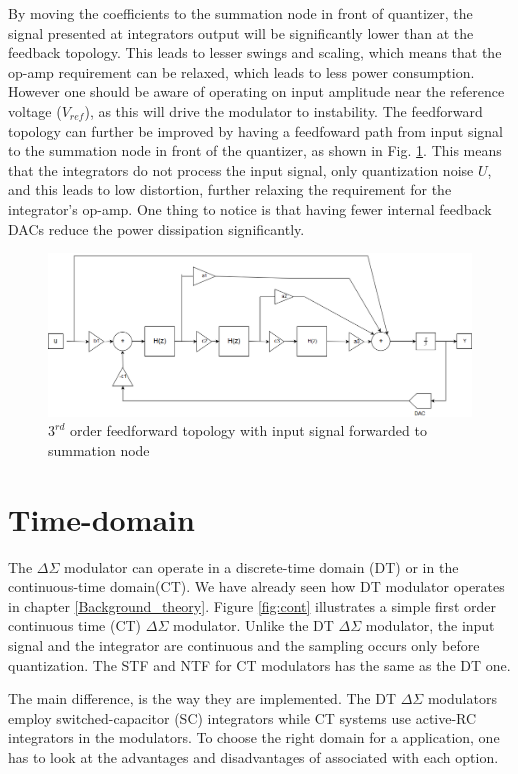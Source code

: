 By moving the coefficients to the summation node in front of quantizer, the signal presented at integrators output will be significantly lower than at the feedback topology. This leads to lesser swings and scaling, which means that the op-amp requirement can be relaxed, which leads to less power consumption. However one should be aware of operating on input amplitude near the reference voltage ($V_{ref}$), as this will drive the modulator to instability. The feedforward topology can further be improved by having a feedfoward path from input signal to the summation node in front of the quantizer, as shown in Fig. \ref{fig:input}. This means that the integrators do not process the input signal, only quantization noise $U$, and this leads to low distortion\cite[Ch.4.4.2]{Richard}, further relaxing the requirement for the integrator's op-amp. One thing to notice is that having fewer internal feedback DACs reduce the power dissipation significantly. 

\begin{figure}\label{final_top}
\centering
\includegraphics[scale=0.35]{images/feedforward.png}
\caption{$3^{rd}$ order feedforward topology with input signal forwarded to summation node}
\label{fig:input}
\end{figure}

\section{Time-domain}
The $\Delta\Sigma$ modulator can operate in a discrete-time domain (DT) or in the continuous-time domain(CT)\cite{Richard}. We have already seen how DT modulator operates in chapter \ref{Background_theory}. Figure \ref{fig:cont} illustrates a simple first order continuous time (CT) $\Delta\Sigma$ modulator. Unlike the DT $\Delta\Sigma$ modulator, the input signal and the integrator are continuous and the sampling occurs only before quantization. The STF and NTF for CT modulators has the same as the DT one.    

The main difference, is the way they are implemented. The DT $\Delta\Sigma$ modulators employ switched-capacitor (SC) integrators while CT systems use active-RC integrators in the modulators. To choose the right domain for a application, one has to look at the advantages and disadvantages of associated with each option.

